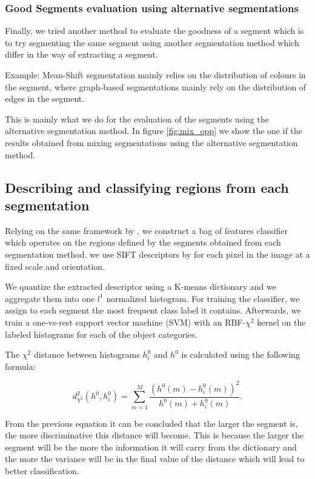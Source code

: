 \documentclass[twoside,11pt]{article}
\begin{document}
\subsubsection{Good Segments evaluation using alternative segmentations}

Finally, we tried another method to evaluate the goodness of a segment which
is to try segmenting the same segment using another segmentation method which
differ in the way of extracting a segment.

Example: Mean-Shift segmentation mainly relies on the distribution of colours in
the segment, where graph-based segmentations mainly rely on the distribution of
edges in the segment.

This is mainly what we do for the evaluation of the segments using the
alternative segmentation method. In figure \ref{fig:mix_opp} we show the one if
the results obtained from mixing segmentations using the alternative segmentation
method.

\subsection{Describing and classifying regions from each segmentation}

Relying on the same framework by \cite{fulkerson09class}, we construct a bag
of features classifier which operates on the regions defined by the segments
obtained from each segmentation method. we use SIFT descriptors by for each pixel
in the image at a fixed scale and orientation.

We quantize the extracted descriptor using a K-means dictionary and we aggregate
them into one $l^1$ normalized histogram. For training the classifier, we assign
to each segment the  most frequent class label it contains. Afterwards, we train
a one-vs-rest support vector  machine (SVM) with an RBF-$\chi^2$ kernel on the
labeled histograms for each of the object categories.

The $\chi^2$ distance between histograms $h_i^0$ and $h^0$ is calculated using
the following formula:

\begin{equation}
d^2_{\chi^2}(h^0,h^0_i) = \sum_{m=1}^M{\frac{(h^0(m) - h^0_i(m))^2}{h^0(m) +
h^0_i(m)}}.
\end{equation}

From the previous equation it can be concluded that the larger the segment is, 
the more discriminative this distance will become. This is because the larger the
segment will be the more the information it will carry from the dictionary and the
more the variance will be in the final value of the distance which will lead
to better classification.
\end{document}
